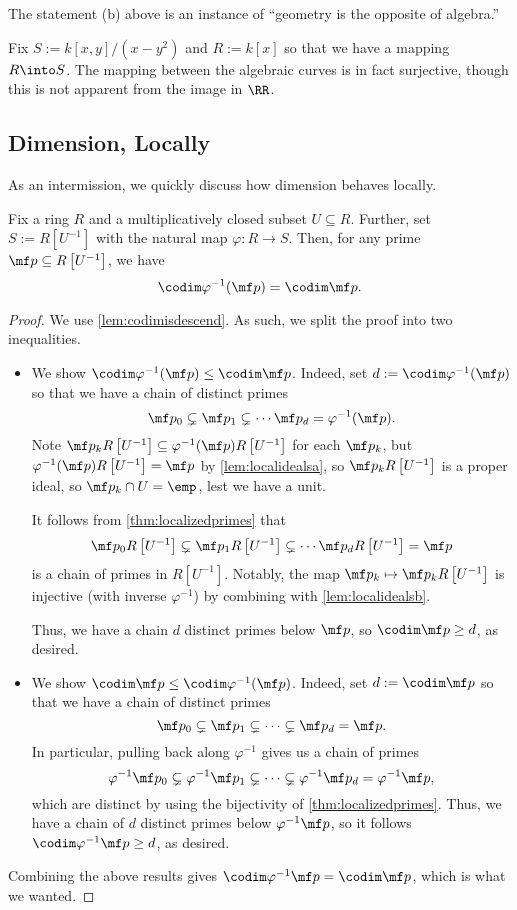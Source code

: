\begin{remark}[Nir]
	The statement (b) above is an instance of ``geometry is the opposite of algebra.''
\end{remark}
\begin{example}
	Fix $S:=k[x,y]/\left(x-y^2\right)$ and $R:=k[x]$ so that we have a mapping $R\into S$. The mapping between the algebraic curves is in fact surjective, though this is not apparent from the image in $\RR$.
\end{example}

\subsection{Dimension, Locally}
As an intermission, we quickly discuss how dimension behaves locally.
\begin{lem}
	Fix a ring $R$ and a multiplicatively closed subset $U\subseteq R$. Further, set $S:=R\left[U^{-1}\right]$ with the natural map $\varphi:R\to S$. Then, for any prime $\mf p\subseteq R\left[U^{-1}\right]$, we have
	\[\codim\varphi^{-1}(\mf p)=\codim\mf p.\]
\end{lem}
\begin{proof}
	We use \autoref{lem:codimisdescend}. As such, we split the proof into two inequalities.
	\begin{itemize}
		\item We show $\codim\varphi^{-1}(\mf p)\le\codim\mf p$. Indeed, set $d:=\codim\varphi^{-1}(\mf p)$ so that we have a chain of distinct primes
		\[\mf p_0\subsetneq\mf p_1\subsetneq\cdots\mf p_d=\varphi^{-1}(\mf p).\]
		Note $\mf p_kR\left[U^{-1}\right]\subseteq\varphi^{-1}(\mf p)R\left[U^{-1}\right]$ for each $\mf p_k$, but $\varphi^{-1}(\mf p)R\left[U^{-1}\right]=\mf p$ by \autoref{lem:localidealsa}, so $\mf p_kR\left[U^{-1}\right]$ is a proper ideal, so $\mf p_k\cap U=\emp$, lest we have a unit.

		It follows from \autoref{thm:localizedprimes} that
		\[\mf p_0R\left[U^{-1}\right]\subsetneq\mf p_1R\left[U^{-1}\right]\subsetneq\cdots\mf p_dR\left[U^{-1}\right]=\mf p\]
		is a chain of primes in $R\left[U^{-1}\right]$. Notably, the map $\mf p_k\mapsto\mf p_kR\left[U^{-1}\right]$ is injective (with inverse $\varphi^{-1}$) by combining with \autoref{lem:localidealsb}.

		Thus, we have a chain $d$ distinct primes below $\mf p$, so $\codim\mf p\ge d$, as desired.

		\item We show $\codim\mf p\le\codim\varphi^{-1}(\mf p)$. Indeed, set $d:=\codim\mf p$ so that we have a chain of distinct primes
		\[\mf p_0\subsetneq\mf p_1\subsetneq\cdots\subsetneq\mf p_d=\mf p.\]
		In particular, pulling back along $\varphi^{-1}$ gives us a chain of primes
		\[\varphi^{-1}\mf p_0\subsetneq\varphi^{-1}\mf p_1\subsetneq\cdots\subsetneq\varphi^{-1}\mf p_d=\varphi^{-1}\mf p,\]
		which are distinct by using the bijectivity of \autoref{thm:localizedprimes}. Thus, we have a chain of $d$ distinct primes below $\varphi^{-1}\mf p$, so it follows $\codim\varphi^{-1}\mf p\ge d$, as desired.
	\end{itemize}
	Combining the above results gives $\codim\varphi^{-1}\mf p=\codim\mf p$, which is what we wanted.
\end{proof}
